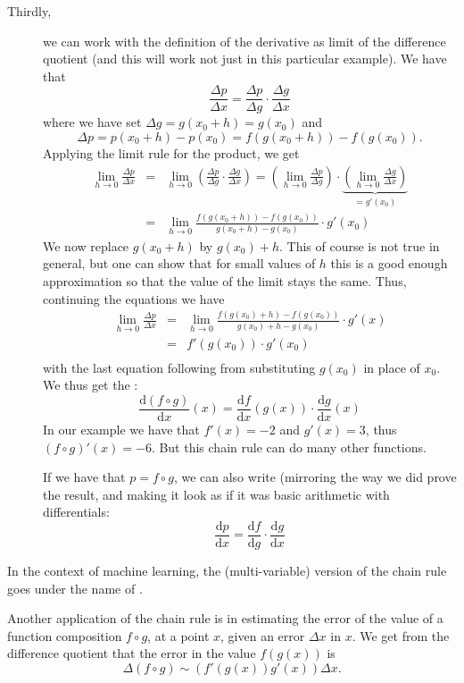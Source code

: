 \begin{description}
\item[Thirdly,] we can work with the definition of the derivative as limit
of the difference quotient (and this
will work not just in this particular example). We have that
\[
\frac{\Delta p}{\Delta x}=\frac{\Delta p}{\Delta g}\cdot\frac{\Delta
g}{\Delta x}
\]
where we have set $\Delta g=g(x_0+h)=g(x_0)$ and 
\[
\Delta p=p(x_0+h)-p(x_0)=f(g(x_0+h))-f(g(x_0)).
\]
Applying the limit rule for the product, we get
\begin{eqnarray*}
\lim_{h\to 0} \frac{\Delta p}{\Delta x}
&=&\lim_{h\to 0}\left(\frac{\Delta p}{\Delta g}\cdot\frac{\Delta g}{\Delta x}\right)
=\left(\lim_{h\to 0}\frac{\Delta p}{\Delta g}\right)\cdot\underbrace{\left(\lim_{h\to 0}\frac{\Delta
g}{\Delta x}\right)}_{=g'(x_0)}\\
&=&\lim_{h\to 0}\frac{f(g(x_0+h))-f(g(x_0))}{g(x_0+h)-g(x_0)}\cdot g'(x_0)
\end{eqnarray*}
We now replace $g(x_0+h)$ by $g(x_0)+h$. This of course is not true in
general, but one can show that for small values of $h$ this is a good
enough approximation so that the value of the limit stays the same. Thus,
continuing the equations we have
\begin{eqnarray*}
\lim_{h\to 0} \frac{\Delta p}{\Delta x}
&=&\lim_{h\to 0}\frac{f(g(x_0)+h)-f(g(x_0))}{g(x_0)+h-g(x_0)}\cdot g'(x)\\
&=&f'(g(x_0))\cdot g'(x_0)\\
\end{eqnarray*}
with the last equation following from substituting $g(x_0)$ in place of
$x_0$. We thus get the :
\[
\frac{\mbox{d}(f\circ
g)}{\mbox{d}x}(x)=\frac{\mbox{d}f}{\mbox{d}x}(g(x))\cdot
\frac{\mbox{d}g}{\mbox{d}x}(x)
\]
In our example we have that $f'(x)=-2$ and $g'(x)=3$, thus $(f\circ
g)'(x)=-6$. But this chain rule can do many other functions.
\smallskip

If we have that $p=f\circ g$, we can also write (mirroring the way we did
prove the result, and making it look as if it was basic arithmetic with
differentials:
\[
\frac{\mbox{d}p}{\mbox{d}x}=
\frac{\mbox{d}f}{\mbox{d}g}\cdot \frac{\mbox{d}g}{\mbox{d}x}
\]
\end{description}
In the context of machine learning, the (multi-variable) version of the
chain rule goes under the name of .
\smallskip

Another application of the chain rule is in estimating the error of the value of a function
composition $f\circ g$, at a point $x$, given an error $\Delta x$ in $x$. We
get from the difference quotient that the error in the value $f(g(x))$ is
\[
\Delta(f\circ g)\sim\left(f'(g(x))g'(x)\right)\Delta x.
\]

